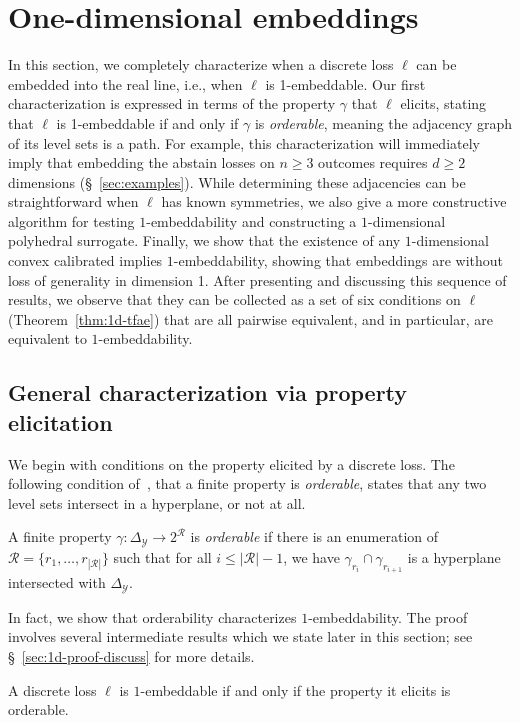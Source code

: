 \documentclass[final]{colt2020} %
\newcommand{\simplex}{\Delta_\Y}
\newcommand{\R}{\mathcal{R}}
\newcommand{\Y}{\mathcal{Y}}
\begin{document}
\section{One-dimensional embeddings}
\label{sec:1d}

In this section, we completely characterize when a discrete loss $\ell$ can be embedded into the real line, i.e., when $\ell$ is 1-embeddable.
Our first characterization is expressed in terms of the property $\gamma$ that $\ell$ elicits, stating that $\ell$ is 1-embeddable if and only if $\gamma$ is \emph{orderable}, meaning the adjacency graph of its level sets is a path.
For example, this characterization will immediately imply that embedding the abstain losses on $n \geq 3$ outcomes requires $d \geq 2$ dimensions (\S~\ref{sec:examples}).
While determining these adjacencies can be straightforward when $\ell$ has known symmetries, we also give a more constructive algorithm for testing $1$-embeddability and constructing a $1$-dimensional polyhedral surrogate.
Finally, we show that the existence of any $1$-dimensional convex calibrated implies $1$-embeddability, showing that embeddings are without loss of generality in dimension 1.
After presenting and discussing this sequence of results, we observe that they can be collected as a set of six conditions on $\ell$ (Theorem~\ref{thm:1d-tfae}) that are all pairwise equivalent, and in particular, are equivalent to $1$-embeddability.

\subsection{General characterization via property elicitation}

We begin with conditions on the property elicited by a discrete loss.
The following condition of~\citet[Theorem 3]{lambert2018elicitation}, that a finite property is \emph{orderable}, states that any two level sets intersect in a hyperplane, or not at all.
\begin{definition}[Orderable]\label{def:orderable-hyperplane}
	A finite property $\gamma:\simplex \to 2^\R$ is \emph{orderable} if there is an enumeration of $\R = \{r_1, \ldots, r_{|\R|}\}$ such that for all $i \leq |\R| - 1$, we have $\gamma_{r_i} \cap \gamma_{r_{i+1}}$ is a hyperplane intersected with $\simplex$.
\end{definition}

In fact, we show that orderability characterizes $1$-embeddability.
The proof involves several intermediate results which we state later in this section; see \S~\ref{sec:1d-proof-discuss} for more details. 
\begin{theorem} \label{thm:orderable-iff-1d}
  A discrete loss $\ell$ is $1$-embeddable if and only if the property it elicits is orderable.
\end{theorem}
\end{document}
